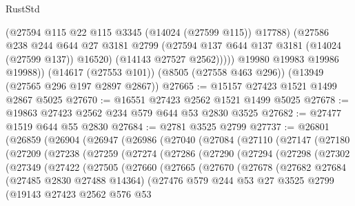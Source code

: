 \begin{lexlean}{RustStd}
\begin{coremodule}
              (@27594 @115 @22 @115 @3345 (@14024 (@27599 @115)) @17788)
              (@27586
                @238
                @244
                @644
                @27
                @3181
                @2799
                (@27594 @137 @644 @137 @3181 (@14024 (@27599 @137)) @16520)
                (@14143 @27527 @2562)))))
        @19980
        @19983
        @19986
        @19988))
    (@14617 (@27553 @101))
    (@8505 (@27558 @463 @296))
    (@13949 (@27565 @296 @197 @2897 @2867))
@27665 := @15157 @27423 @1521 @1499 @2867 @5025
@27670 := @16551 @27423 @2562 @1521 @1499 @5025
@27678 := @19863 @27423 @2562 @234 @579 @644 @53 @2830 @3525
@27682 := @27477 @1519 @644 @55 @2830
@27684 := @2781 @3525 @2799
@27737 := @26801
    (@26859
      (@26904
        (@26947
          (@26986
            (@27040
              (@27084
                (@27110
                  (@27147
                    (@27180
                      (@27209
                        (@27238
                          (@27259
                            (@27274
                              (@27286
                                (@27290
                                  (@27294
                                    (@27298
                                      (@27302
                                        (@27349
                                          (@27422
                                            (@27505
                                              (@27660
                                                (@27665
                                                  (@27670
                                                    (@27678
                                                      (@27682
                                                        @27684
                                                        (@27485 @2830 @27488 @14364)
                                                        (@27476
                                                          @579
                                                          @244
                                                          @53
                                                          @27
                                                          @3525
                                                          @2799
                                                          (@19143
                                                            @27423
                                                            @2562
                                                            @576
                                                            @53

\end{coremodule}
\end{lexlean}
